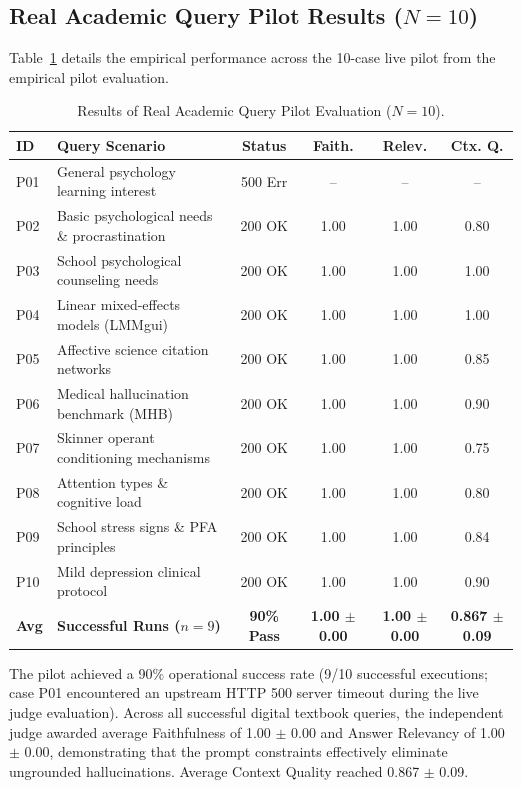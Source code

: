 \documentclass[10pt]{SPIIRAS_Proceedings}
\begin{document}
\subsection{Real Academic Query Pilot Results ($N=10$)}
Table~\ref{tab:pilot_results} details the empirical performance across the 10-case live pilot from the empirical pilot evaluation.

\begin{table}[!t]
\centering
\caption{Results of Real Academic Query Pilot Evaluation ($N=10$).}
\label{tab:pilot_results}
\scriptsize
\setlength{\tabcolsep}{2.5pt}
\begin{tabularx}{\textwidth}{l>{\raggedright\arraybackslash}Xcccc}
\toprule
\textbf{ID} & \textbf{Query Scenario} & \textbf{Status} & \textbf{Faith.} & \textbf{Relev.} & \textbf{Ctx. Q.} \\
\midrule
P01 & General psychology learning interest & 500 Err & -- & -- & -- \\
P02 & Basic psychological needs \& procrastination & 200 OK & 1.00 & 1.00 & 0.80 \\
P03 & School psychological counseling needs & 200 OK & 1.00 & 1.00 & 1.00 \\
P04 & Linear mixed-effects models (LMMgui) & 200 OK & 1.00 & 1.00 & 1.00 \\
P05 & Affective science citation networks & 200 OK & 1.00 & 1.00 & 0.85 \\
P06 & Medical hallucination benchmark (MHB) & 200 OK & 1.00 & 1.00 & 0.90 \\
P07 & Skinner operant conditioning mechanisms & 200 OK & 1.00 & 1.00 & 0.75 \\
P08 & Attention types \& cognitive load & 200 OK & 1.00 & 1.00 & 0.80 \\
P09 & School stress signs \& PFA principles & 200 OK & 1.00 & 1.00 & 0.84 \\
P10 & Mild depression clinical protocol & 200 OK & 1.00 & 1.00 & 0.90 \\
\midrule
\textbf{Avg} & \textbf{Successful Runs ($n=9$)} & \textbf{90\% Pass} & \textbf{1.00 $\pm$ 0.00} & \textbf{1.00 $\pm$ 0.00} & \textbf{0.867 $\pm$ 0.09} \\
\bottomrule
\end{tabularx}
\end{table}

The pilot achieved a 90\% operational success rate (9/10 successful executions; case P01 encountered an upstream HTTP 500 server timeout during the live judge evaluation). Across all successful digital textbook queries, the independent judge awarded average Faithfulness of 1.00 $\pm$ 0.00 and Answer Relevancy of 1.00 $\pm$ 0.00, demonstrating that the prompt constraints effectively eliminate ungrounded hallucinations. Average Context Quality reached 0.867 $\pm$ 0.09.
\end{document}
